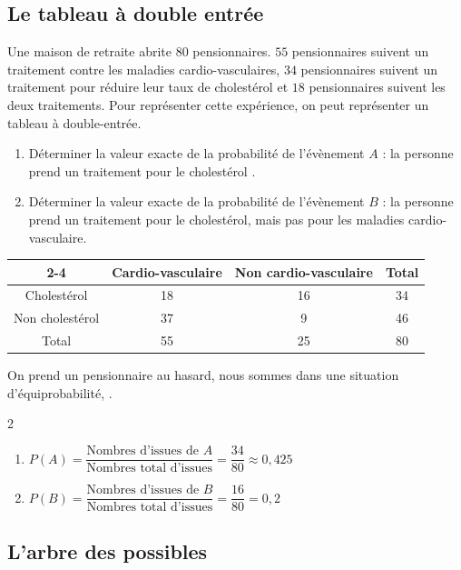 \subsection{Le tableau à double entrée}
\noindent Une maison de retraite abrite $80$ pensionnaires. $55$ pensionnaires suivent un traitement contre les maladies cardio-vasculaires, $34$ pensionnaires suivent un traitement pour réduire leur taux de cholestérol et $18$ pensionnaires suivent les deux traitements. Pour représenter cette expérience, on peut représenter un tableau à double-entrée.
\begin{enumerate}
\item Déterminer la valeur exacte de la probabilité de l'évènement $A$ : \og la personne prend un traitement pour le cholestérol \fg{}. 
\item Déterminer la valeur exacte de la probabilité de l'évènement $B$ : \og la personne prend un traitement pour le cholestérol, mais pas pour les maladies cardio-vasculaire\fg{}.
\end{enumerate}
\begin{center}\begin{tabular}{|c|c|c|c|} 
\cline{2-4}  
\multicolumn{1}{c|}{} & Cardio-vasculaire & Non cardio-vasculaire & Total \\  
\hline 
Cholestérol & 18 & 16 & 34 \\  
\hline 
Non cholestérol & 37 & 9 & 46 \\  
\hline 
Total & 55 & 25 & 80 \\ 
\hline
\end{tabular}
\end{center}
\noindent On prend un pensionnaire au hasard, nous sommes dans une situation d'équiprobabilité, .
\begin{multicols}{2}
\begin{enumerate}
\item $P(A)=\dfrac{\text{Nombres d'issues de }A}{\text{Nombres total d'issues}}=\dfrac{34}{80}\approx 0,425 $
\item $P(B)=\dfrac{\text{Nombres d'issues de }B}{\text{Nombres total d'issues}}=\dfrac{16}{80}=0,2$
\end{enumerate}
\end{multicols}
\newpage

\subsection{L'arbre des possibles}

